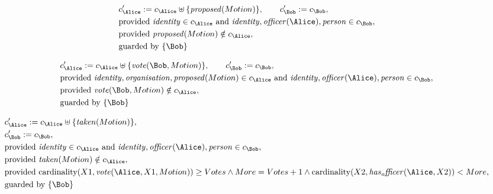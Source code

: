 \begin{align*}
&
c'_
{
\Alice
}
 := 
c_
{
\Alice
}
 \uplus 
\{
\mathit{
proposed
}
(
Motion
)
\}
, \qquad 
c'_
{
\Bob
}
 := 
c_
{
\Bob
}
,\\
&
\text{provided } 
\mathit{
identity
}
 \in c_
{
\Alice
}
 \text{ and } 
\mathit{
identity
}
,
\mathit{
officer
}
(
\Alice
)
,
\mathit{
person
}
 \in c_
{
\Bob
}
,\\
&
\text{provided } 
\mathit{
proposed
}
(
Motion
)
 \notin c_
{
\Alice
}
,\\
&
\text{guarded by } \{
\Bob
\}
\end{align*}

\begin{align*}
&
c'_
{
\Alice
}
 := 
c_
{
\Alice
}
 \uplus 
\{
\mathit{
vote
}
(
\Bob
,
Motion
)
\}
, \qquad 
c'_
{
\Bob
}
 := 
c_
{
\Bob
}
,\\
&
\text{provided } 
\mathit{
identity
}
,
\mathit{
organisation
}
,
\mathit{
proposed
}
(
Motion
)
 \in c_
{
\Alice
}
 \text{ and } 
\mathit{
identity
}
,
\mathit{
officer
}
(
\Alice
)
,
\mathit{
person
}
 \in c_
{
\Bob
}
,\\
&
\text{provided } 
\mathit{
vote
}
(
\Bob
,
Motion
)
 \notin c_
{
\Alice
}
,\\
&
\text{guarded by } \{
\Bob
\}
\end{align*}

\begin{align*}
&
c'_
{
\Alice
}
 := 
c_
{
\Alice
}
 \uplus 
\{
\mathit{
taken
}
(
Motion
)
\}
,\\
&
c'_
{
\Bob
}
 := 
c_
{
\Bob
}
,\\
&
\text{provided } 
\mathit{
identity
}
 \in c_
{
\Alice
}
 \text{ and } 
\mathit{
identity
}
,
\mathit{
officer
}
(
\Alice
)
,
\mathit{
person
}
 \in c_
{
\Bob
}
,\\
&
\text{provided } 
\mathit{
taken
}
(
Motion
)
 \notin c_
{
\Alice
}
,\\
&
\text{provided } 
\mathrm{cardinality}(
X1
,
\mathit{
vote
}
(
\Alice
,
X1
,
Motion
)
)
\ge
Votes
\land
More
=
Votes
+
1
\land
\mathrm{cardinality}(
X2
,
\mathit{
has_officer
}
(
\Alice
,
X2
)
)
<
More
,\\
&
\text{guarded by } \{
\Bob
\}
\end{align*}


